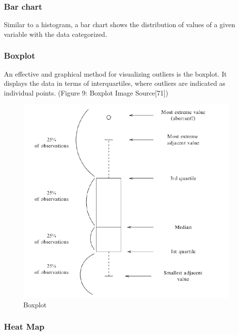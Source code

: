 \documentclass[11pt,]{article}
\begin{document}
\subsubsection{Bar chart}\label{bar-chart}

Similar to a histogram, a bar chart shows the distribution of values of
a given variable with the data categorized.

\subsubsection{Boxplot}\label{boxplot}

An effective and graphical method for visualizing outliers is the
boxplot. It displays the data in terms of interquartiles, where outliers
are indicated as individual points. (Figure 9: Boxplot Image
Source{[}71{]})

\begin{figure}

{\centering \includegraphics{thesis_files/figure-latex/unnamed-chunk-15-1} 

}

\caption{Boxplot}\label{fig:unnamed-chunk-15}
\end{figure}

\subsubsection{Heat Map}\label{heat-map}
\end{document}
